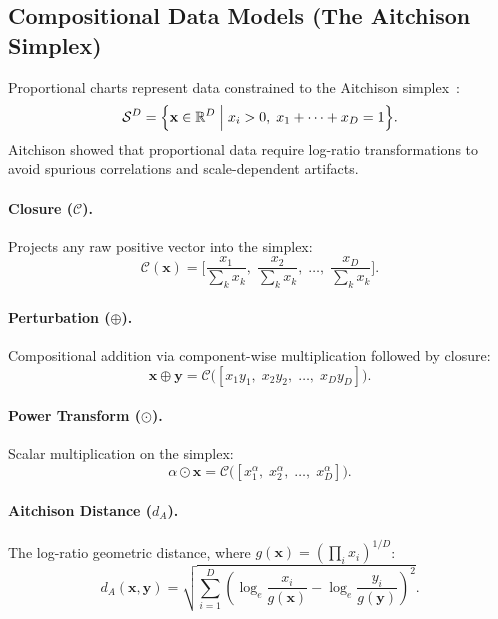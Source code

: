 \documentclass[11pt,twocolumn]{article}
\newcommand{\simplex}{\mathcal{S}}
\newcommand{\closure}{\mathcal{C}}
\newcommand{\R}{\mathbb{R}}
\begin{document}
\subsection{Compositional Data Models (The Aitchison Simplex)}\label{sec:simplex}

Proportional charts represent data constrained to the Aitchison simplex~\cite{aitchison1986statistical}:
\begin{equation}\label{eq:simplex}
  \simplex^D = \Bigl\{\mathbf{x} \in \R^D \;\Big|\; x_i > 0,\; x_1 + \dots + x_D = 1\Bigr\}.
\end{equation}
Aitchison showed that proportional data require log-ratio transformations to avoid spurious correlations and scale-dependent artifacts.

\paragraph{Closure ($\closure$).} Projects any raw positive vector into the simplex:
\begin{equation}\label{eq:closure}
  \closure(\mathbf{x}) = \biggl[\frac{x_1}{\sum_k x_k},\;\frac{x_2}{\sum_k x_k},\;\ldots,\;\frac{x_D}{\sum_k x_k}\biggr].
\end{equation}

\paragraph{Perturbation ($\oplus$).} Compositional addition via component-wise multiplication followed by closure:
\begin{equation}\label{eq:perturbation}
  \mathbf{x} \oplus \mathbf{y} = \closure\bigl([x_1 y_1,\; x_2 y_2,\;\ldots,\; x_D y_D]\bigr).
\end{equation}

\paragraph{Power Transform ($\odot$).} Scalar multiplication on the simplex:
\begin{equation}\label{eq:power}
  \alpha \odot \mathbf{x} = \closure\bigl([x_1^\alpha,\; x_2^\alpha,\;\ldots,\; x_D^\alpha]\bigr).
\end{equation}

\paragraph{Aitchison Distance ($d_A$).} The log-ratio geometric distance, where $g(\mathbf{x}) = (\prod_i x_i)^{1/D}$:
\begin{equation}\label{eq:aitchison_dist}
  d_A(\mathbf{x}, \mathbf{y}) = \sqrt{\sum_{i=1}^D \left(\log_e\frac{x_i}{g(\mathbf{x})} - \log_e\frac{y_i}{g(\mathbf{y})}\right)^{\!2}}.
\end{equation}
\end{document}
